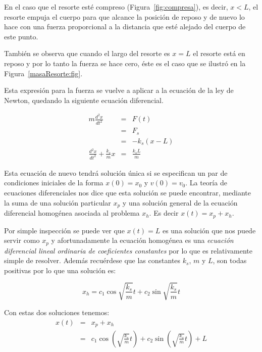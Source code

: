 En el caso que el resorte esté compreso (Figura~\ref{fig:compresa}), es decir, $ x < L$, el resorte empuja el cuerpo para que alcance la posición de reposo y de nuevo lo hace con una fuerza proporcional a la distancia que esté alejado del cuerpo de este punto. 

También se observa que cuando el largo del resorte es $ x = L$ el resorte está en reposo y por lo tanto la fuerza se hace cero, éste es el caso que se ilustró en la Figura~\ref{masaResorte:fig}.

Esta expresión para la fuerza se vuelve a aplicar a la ecuación de la ley de Newton, quedando la siguiente ecuación diferencial.

\begin{eqnarray}
m \frac{d^2x}{dt^2} & = & F(t) \nonumber \\
                    & = & F_s \nonumber \\
                    & = & -k_s \left( x - L \right) \nonumber \\
\frac{d^2x}{dt^2} + \frac{k_s}{m}x  & = & \frac{k_s L}{m}
\end{eqnarray}

Esta ecuación de nuevo tendrá solución única si se especifican un par de condiciones iniciales de la forma $x(0) = x_0$ y $ v(0) = v_0 $.
La teoría de ecuaciones diferenciales nos dice que esta solución se puede encontrar, mediante la suma de una solución particular $x_p$ y una solución general de la ecuación diferencial homogénea asociada al problema $x_h$.
Es decir $x(t) = x_p + x_h$.

Por simple inspección se puede ver que $x(t)= L$ es una solución que nos puede servir como $x_p$ y afortunadamente la ecuación homogénea  es una \emph{ecuación diferencial lineal ordinaria de coeficientes constantes} por lo que es relativamente simple de resolver.
Además recuérdese que las constantes $k_s$, $m$ y $L$, son todas positivas por lo que una solución es:

\begin{equation}
x_h = c_1 \cos{\sqrt{\frac{k_s}{m}}}t + c_2 \sin{\sqrt{\frac{k_s}{m}}}t
\end{equation}

Con estas dos soluciones tenemos:
\begin{eqnarray}
x(t) & = & x_p + x_h \nonumber \\
     & = & c_1 \cos{\left(\sqrt{\frac{k_s}{m}} t \right)} + c_2 \sin{\left(\sqrt{\frac{k_s}{m}} t \right)} + L
\end{eqnarray}

